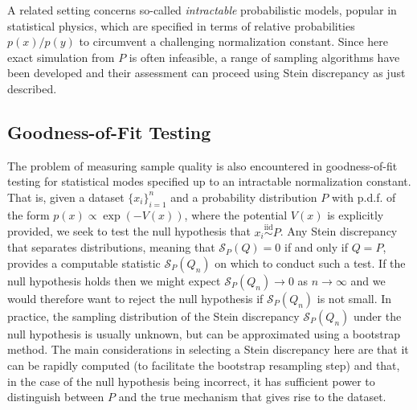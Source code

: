 \documentclass[12pt,paper=letter]{scrreprt}
\begin{document}
A related setting concerns so-called \emph{intractable} probabilistic models, popular in statistical physics, which are specified in terms of relative probabilities $p(x) / p(y)$ to circumvent a challenging normalization constant.
Since here exact simulation from $P$ is often infeasible, a range of sampling algorithms have been developed \citep[see e.g.][]{newman1999monte} and their assessment can proceed using Stein discrepancy as just described.



\subsection{Goodness-of-Fit Testing}
\label{sec: GoF}

The problem of measuring sample quality is also encountered in goodness-of-fit testing for statistical modes specified up to an intractable normalization constant.
That is, given a dataset $\{x_i\}_{i=1}^n$ and a probability distribution $P$ with p.d.f. of the form $p(x) \propto \exp(-V(x))$, where the potential $V(x)$ is explicitly provided, we seek to test the null hypothesis that $x_i \stackrel{\mathrm{iid}}{\sim} P$.
Any Stein discrepancy that separates distributions, meaning that $\mathcal{S}_P(Q) = 0$ if and only if $Q = P$, provides a computable statistic $\mathcal{S}_P(Q_n)$ on which to conduct such a test.
If the null hypothesis holds then we might expect $\mathcal{S}_P(Q_n) \rightarrow 0$ as $n \rightarrow \infty$ and we would therefore want to reject the null hypothesis if $\mathcal{S}_P(Q_n)$ is not small.
In practice, the sampling distribution of the Stein discrepancy $\mathcal{S}_P(Q_n)$ under the null hypothesis is usually unknown, but can be approximated using a bootstrap method.
The main considerations in selecting a Stein discrepancy here are that it can be rapidly computed (to facilitate the bootstrap resampling step) and that, in the case of the null hypothesis being incorrect, it has sufficient power to distinguish between $P$ and the true mechanism that gives rise to the dataset.
\end{document}
